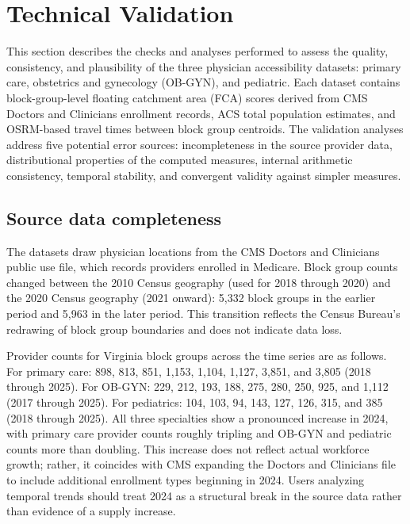 \documentclass{CUP-JNL-DAP}%
\begin{document}

\section{Technical Validation}

This section describes the checks and analyses performed to assess the quality, consistency, and plausibility of the three physician accessibility datasets: primary care, obstetrics and gynecology (OB-GYN), and pediatric. Each dataset contains block-group-level floating catchment area (FCA) scores derived from CMS Doctors and Clinicians enrollment records, ACS total population estimates, and OSRM-based travel times between block group centroids. The validation analyses address five potential error sources: incompleteness in the source provider data, distributional properties of the computed measures, internal arithmetic consistency, temporal stability, and convergent validity against simpler measures.

\subsection{Source data completeness}

The datasets draw physician locations from the CMS Doctors and Clinicians public use file, which records providers enrolled in Medicare. Block group counts changed between the 2010 Census geography (used for 2018 through 2020) and the 2020 Census geography (2021 onward): 5{,}332 block groups in the earlier period and 5{,}963 in the later period. This transition reflects the Census Bureau's redrawing of block group boundaries and does not indicate data loss.

Provider counts for Virginia block groups across the time series are as follows. For primary care: 898, 813, 851, 1{,}153, 1{,}104, 1{,}127, 3{,}851, and 3{,}805 (2018 through 2025). For OB-GYN: 229, 212, 193, 188, 275, 280, 250, 925, and 1{,}112 (2017 through 2025). For pediatrics: 104, 103, 94, 143, 127, 126, 315, and 385 (2018 through 2025). All three specialties show a pronounced increase in 2024, with primary care provider counts roughly tripling and OB-GYN and pediatric counts more than doubling. This increase does not reflect actual workforce growth; rather, it coincides with CMS expanding the Doctors and Clinicians file to include additional enrollment types beginning in 2024. Users analyzing temporal trends should treat 2024 as a structural break in the source data rather than evidence of a supply increase.
\end{document}
